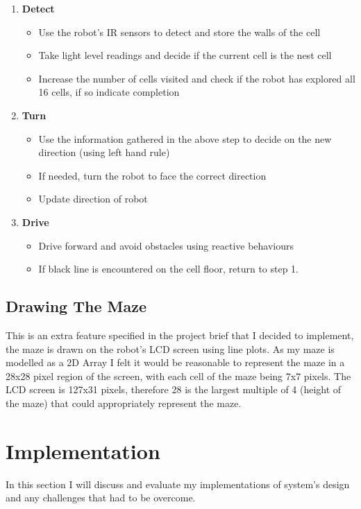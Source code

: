 \documentclass[a4paper]{article}
\begin{document}
	\begin{enumerate}
		\item \textbf{Detect}
		\begin{itemize}
			\item Use the robot's IR sensors to detect and store the walls of the cell
			\item Take light level readings and decide if the current cell is the nest cell
			\item Increase the number of cells visited and check if the robot has explored all 16 cells, if so indicate completion
		\end{itemize}
		\item \textbf{Turn}
		\begin{itemize}
			\item Use the information gathered in the above step to decide on the new direction (using left hand rule)
			\item If needed, turn the robot to face the correct direction
			\item Update direction of robot
		\end{itemize}
		\item \textbf{Drive}
		\begin{itemize}
			\item Drive forward and avoid obstacles using reactive behaviours
			\item If black line is encountered on the cell floor, return to step 1.
		\end{itemize}
	\end{enumerate}
	
	\subsection{Drawing The Maze}
	This is an extra feature specified in the project brief that I decided to implement, the maze is drawn on the robot's LCD screen using line plots. As my maze is modelled as a 2D Array I felt it would be reasonable to represent the maze in a 28x28 pixel region of the screen, with each cell of the maze being 7x7 pixels. The LCD screen is 127x31 pixels, therefore 28 is the largest multiple of 4 (height of the maze) that could appropriately represent the maze.\\
	
	\section{Implementation}
	In this section I will discuss and evaluate my implementations of system's design and any challenges that had to be overcome. 
	
\end{document}
